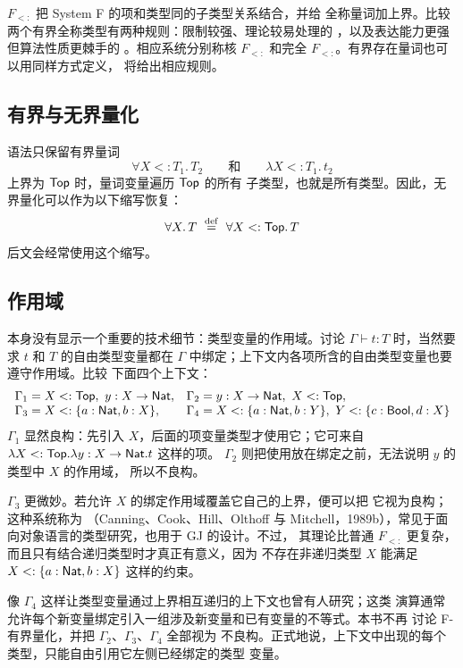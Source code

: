 \(F_{<:}\) 把 System F 的项和类型同的子类型关系结合，并给
全称量词加上界。比较两个有界全称类型有两种规则：限制较强、理论较易处理的
，以及表达能力更强但算法性质更棘手的
。相应系统分别称核 \(F_{<:}\) 和完全
\(F_{<:}\)。有界存在量词也可以用同样方式定义，
将给出相应规则。

\subsection*{有界与无界量化}

语法只保留有界量词
\[
\forall X<:T_1.\,T_2
\qquad\text{和}\qquad
\lambda X<:T_1.\,t_2
\]
上界为 \(\mathsf{Top}\) 时，量词变量遍历 \(\mathsf{Top}\) 的所有
子类型，也就是所有类型。因此，无界量化可以作为以下缩写恢复：
\[
\forall X.\,T\ \overset{\mathrm{def}}{=}\
\forall X<:\mathsf{Top}.\,T
\]
后文会经常使用这个缩写。

\subsection*{作用域}

本身没有显示一个重要的技术细节：类型变量的作用域。讨论
\(\Gamma\vdash t:T\) 时，当然要求 \(t\) 和 \(T\) 的自由类型变量都在
\(\Gamma\) 中绑定；上下文内各项所含的自由类型变量也要遵守作用域。比较
下面四个上下文：
\[
\begin{array}{ll}
\Gamma_1=X<:\mathsf{Top},\ y:X\to\mathsf{Nat},&
\Gamma_2=y:X\to\mathsf{Nat},\ X<:\mathsf{Top},\\
\Gamma_3=X<:\{a:\mathsf{Nat},b:X\},&
\Gamma_4=X<:\{a:\mathsf{Nat},b:Y\},\
Y<:\{c:\mathsf{Bool},d:X\}
\end{array}
\]
\(\Gamma_1\) 显然良构：先引入 \(X\)，后面的项变量类型才使用它；它可来自
\(\lambda X<:\mathsf{Top}.\lambda y:X\to\mathsf{Nat}.t\) 这样的项。
\(\Gamma_2\) 则把使用放在绑定之前，无法说明 \(y\) 的类型中 \(X\) 的作用域，
所以不良构。

\(\Gamma_3\) 更微妙。若允许 \(X\) 的绑定作用域覆盖它自己的上界，便可以把
它视为良构；这种系统称为
（Canning、Cook、Hill、Olthoff 与
Mitchell，1989b），常见于面向对象语言的类型研究，也用于 GJ 的设计。不过，
其理论比普通 \(F_{<:}\) 更复杂，而且只有结合递归类型时才真正有意义，因为
不存在非递归类型 \(X\) 能满足
\(X<:\{a:\mathsf{Nat},b:X\}\) 这样的约束。

像 \(\Gamma_4\) 这样让类型变量通过上界相互递归的上下文也曾有人研究；这类
演算通常允许每个新变量绑定引入一组涉及新变量和已有变量的不等式。本书不再
讨论 F-有界量化，并把 \(\Gamma_2\)、\(\Gamma_3\)、\(\Gamma_4\) 全部视为
不良构。正式地说，上下文中出现的每个类型，只能自由引用它左侧已经绑定的类型
变量。

